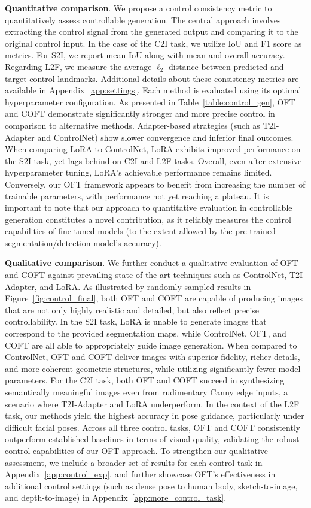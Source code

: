\textbf{Quantitative comparison}. We propose a control consistency metric to quantitatively assess controllable generation. The central approach involves extracting the control signal from the generated output and comparing it to the original control input. In the case of the C2I task, we utilize IoU and F1 score as metrics. For S2I, we report mean IoU along with mean and overall accuracy. Regarding L2F, we measure the average $\ell_2$ distance between predicted and target control landmarks. Additional details about these consistency metrics are available in Appendix~\ref{app:settings}. Each method is evaluated using its optimal hyperparameter configuration. As presented in Table~\ref{table:control_gen}, OFT and COFT demonstrate significantly stronger and more precise control in comparison to alternative methods. Adapter-based strategies (such as T2I-Adapter and ControlNet) show slower convergence and inferior final outcomes. When comparing LoRA to ControlNet, LoRA exhibits improved performance on the S2I task, yet lags behind on C2I and L2F tasks. Overall, even after extensive hyperparameter tuning, LoRA's achievable performance remains limited. Conversely, our OFT framework appears to benefit from increasing the number of trainable parameters, with performance not yet reaching a plateau. It is important to note that our approach to quantitative evaluation in controllable generation constitutes a novel contribution, as it reliably measures the control capabilities of fine-tuned models (to the extent allowed by the pre-trained segmentation/detection model’s accuracy).

\textbf{Qualitative comparison}. We further conduct a qualitative evaluation of OFT and COFT against prevailing state-of-the-art techniques such as ControlNet, T2I-Adapter, and LoRA. As illustrated by randomly sampled results in Figure~\ref{fig:control_final}, both OFT and COFT are capable of producing images that are not only highly realistic and detailed, but also reflect precise controllability. In the S2I task, LoRA is unable to generate images that correspond to the provided segmentation maps, while ControlNet, OFT, and COFT are all able to appropriately guide image generation. When compared to ControlNet, OFT and COFT deliver images with superior fidelity, richer details, and more coherent geometric structures, while utilizing significantly fewer model parameters. For the C2I task, both OFT and COFT succeed in synthesizing semantically meaningful images even from rudimentary Canny edge inputs, a scenario where T2I-Adapter and LoRA underperform. In the context of the L2F task, our methods yield the highest accuracy in pose guidance, particularly under difficult facial poses. Across all three control tasks, OFT and COFT consistently outperform established baselines in terms of visual quality, validating the robust control capabilities of our OFT approach. To strengthen our qualitative assessment, we include a broader set of results for each control task in Appendix~\ref{app:control_exp}, and further showcase OFT's effectiveness in additional control settings (such as dense pose to human body, sketch-to-image, and depth-to-image) in Appendix~\ref{app:more_control_task}.

